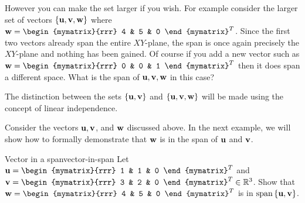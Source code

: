 However you can make the set larger if you wish. For example consider
the larger set of vectors $\{\mbox{\bf u}, \mbox{\bf v},
\mbox{\bf w}\}$ where $ \vect{w}=\begin{mymatrix}{rrr}
  4 & 5 & 0
\end{mymatrix}^T$. 
Since
the first two vectors already span the entire $XY$-plane, the span is
once again precisely the $XY$-plane and nothing has been gained. Of
course if you add a new vector such as
$ \vect{w}=\begin{mymatrix}{rrr}
  0 & 0 & 1
\end{mymatrix}^T$ then it does span a different space. What is the span of $\mbox{\bf u}, \mbox{\bf v}, \mbox{\bf w}$ in this case?   

The distinction between the sets $\{\mbox{\bf u}, \mbox{\bf v}\}$ and $\{
\mbox{\bf u}, \mbox{\bf v}, \mbox{\bf w}\}$ will be made using the concept of linear independence. 

Consider the vectors $\mbox{\bf u}, \mbox{\bf v}$, and $\mbox{\bf w}$ discussed above. In the next example, we will show how to formally demonstrate that $\mbox{\bf w}$ is in the span of $\mbox{\bf u}$ and $\mbox{\bf v}$. 

\begin{example}{Vector in a span}{vector-in-span}
  Let $\vect{u}=\begin{mymatrix}{rrr}
    1  & 1 & 0
  \end{mymatrix}^T$ and
  $\vect{v}=\begin{mymatrix}{rrr}
    3  & 2 & 0
  \end{mymatrix}^T \in \R^{3}$. Show that $\vect{w} = \begin{mymatrix}{rrr}
    4 & 5 & 0 
  \end{mymatrix}^{T}$ is in $\sspan \set{\vect{u}, \vect{v} }$.
\end{example}

